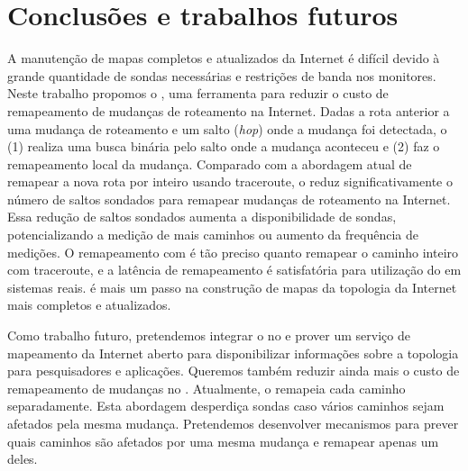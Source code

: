 \section{Conclusões e trabalhos futuros}
\label{sec:conc}

A manutenção de mapas completos e atualizados da Internet é difícil
devido à grande quantidade de sondas necessárias e restrições de banda
nos monitores.  Neste trabalho propomos o \rmprt{}, uma ferramenta para
reduzir o custo de remapeamento de mudanças de roteamento na Internet.
Dadas a rota anterior a uma mudança de roteamento e um salto
(\emph{hop}) onde a mudança foi detectada, o \rmprt{} (1) realiza uma
busca binária pelo salto onde a mudança aconteceu e (2) faz o
remapeamento local da mudança.  Comparado com a abordagem atual de
remapear a nova rota por inteiro usando traceroute, o \rmprt{} reduz
significativamente o número de saltos sondados para remapear mudanças de
roteamento na Internet.  Essa redução de saltos sondados aumenta a
disponibilidade de sondas, potencializando a medição de mais caminhos ou
aumento da frequência de medições.  O remapeamento com \rmprt{} é tão
preciso quanto remapear o caminho inteiro com traceroute, e a latência
de remapeamento é satisfatória para utilização do \rmprt{} em sistemas
reais.  \rmprt{} é mais um passo na construção de mapas da topologia da
Internet mais completos e atualizados.

Como trabalho futuro, pretendemos integrar o \rmprt{} no \dtrack{} e
prover um serviço de mapeamento da Internet aberto para disponibilizar
informações sobre a topologia para pesquisadores e aplicações.  Queremos
também reduzir ainda mais o custo de remapeamento de mudanças no
\dtrack{}.  Atualmente, o \dtrack{} remapeia cada caminho separadamente.
Esta abordagem desperdiça sondas caso vários caminhos sejam afetados
pela mesma mudança.  Pretendemos desenvolver mecanismos para prever
quais caminhos são afetados por uma mesma mudança e remapear apenas um
deles.


